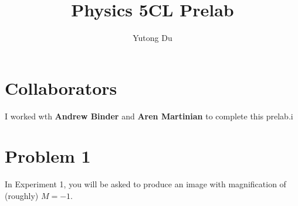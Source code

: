 \documentclass{article}
\title{Physics 5CL Prelab}
\author{Yutong Du}
\begin{document}
\maketitle 

\section*{Collaborators}

I worked wth \textbf{Andrew Binder} and \textbf{Aren Martinian} to complete this prelab.i

\section*{Problem 1}

In Experiment 1, you will be asked to produce an image with magnification of (roughly) $M = -1$. 
\end{document}
